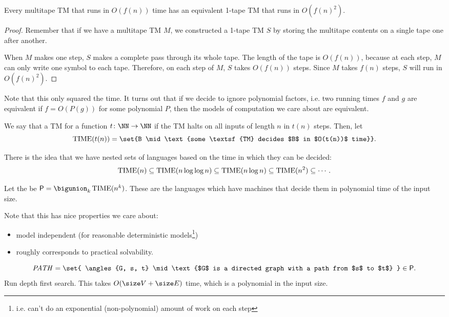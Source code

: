 \documentclass{standalone}
\begin{document}
\begin{proposition}
	Every multitape \textsf{TM} that runs in \(O(f(n))\) time has an equivalent 1-tape \textsf{TM} that runs in \(O(f(n)^2)\).
\end{proposition}
\begin{proof}
	Remember that if we have a multitape \textsf{TM} \(M\), we constructed a 1-tape \textsf{TM} \(S\) by storing the multitape contents on a single tape one after another.

	When \(M\) makes one step, \(S\) makes a complete pass through its whole tape. The length of the tape is \(O(f(n))\), because at each step, \(M\) can only write one symbol to each tape. Therefore, on each step of \(M\), \(S\) takes \(O(f(n))\) steps. Since \(M\) takes \(f(n)\) steps, \(S\) will run in \(O(f(n)^2)\).
\end{proof}
Note that this only squared the time. It turns out that if we decide to ignore polynomial factors, i.e. two running times \(f\) and \(g\) are equivalent if \(f = O(P(g))\) for some polynomial \(P\), then the models of computation we care about are equivalent.

\begin{definition}
	We say that a \textsf{TM}  for a function \(t \colon \NN \to \NN\) if the \textsf{TM} halts on all inputs of length \(n\) in \(t(n)\) steps. Then, let
	\[
		\TIME(t(n)) = \set{B \mid \text{%
			some \textsf{TM} decides $B$ in $O(t(n))$ time%
		}}.
	\]
\end{definition}

There is the idea that we have nested sets of languages based on the time in which they can be decided:
\[
	\operatorname{TIME}(n)
		\subseteq \operatorname{TIME}(n \log \log n)
		\subseteq \operatorname{TIME}(n \log n)
		\subseteq \operatorname{TIME}(n^2)
		\subseteq \cdots.
\]

\begin{definition}
	Let the  be \(\mathsf P = \bigunion_k \TIME(n^k)\). These are the languages which have machines that decide them in polynomial time of the input size.
\end{definition}

Note that this has nice properties we care about:
\begin{itemize}
	\item model independent (for reasonable deterministic models\footnote{i.e. can't do an exponential (non-polynomial) amount of work on each step})
	\item roughly corresponds to practical solvability.
\end{itemize}

\begin{example}
	\[
		\mathit{PATH} = \set{
			\angles{G, s, t} \mid \text{%
				$G$ is a directed graph with a path from $s$ to $t$%
			}
		} \in \mathsf{P}.
	\]
	\tcblower
	Run depth first search. This takes \(O(\size V + \size E)\) time, which is a polynomial in the input size.
\end{example}
\end{document}
